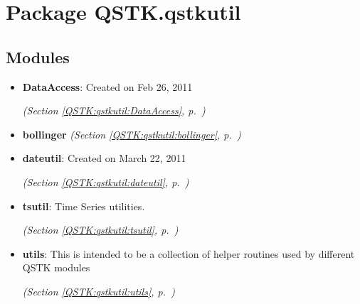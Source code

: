 %
%
%


\section{Package QSTK.qstkutil}

    \label{QSTK:qstkutil}


\subsection{Modules}

\begin{itemize}
\setlength{\parskip}{0ex}
\item \textbf{DataAccess}: Created on Feb 26, 2011



  \textit{(Section \ref{QSTK:qstkutil:DataAccess}, p.~\pageref{QSTK:qstkutil:DataAccess})}

\item \textbf{bollinger}
  \textit{(Section \ref{QSTK:qstkutil:bollinger}, p.~\pageref{QSTK:qstkutil:bollinger})}

\item \textbf{dateutil}: Created on March 22, 2011



  \textit{(Section \ref{QSTK:qstkutil:dateutil}, p.~\pageref{QSTK:qstkutil:dateutil})}

\item \textbf{tsutil}: Time Series utilities.



  \textit{(Section \ref{QSTK:qstkutil:tsutil}, p.~\pageref{QSTK:qstkutil:tsutil})}

\item \textbf{utils}: This is intended to be a collection of helper routines used by different 
QSTK modules



  \textit{(Section \ref{QSTK:qstkutil:utils}, p.~\pageref{QSTK:qstkutil:utils})}

\end{itemize}



